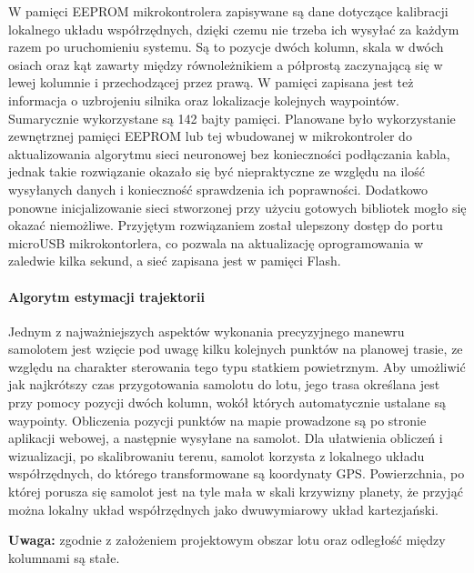 \documentclass[12pt, a4paper]{article}
\begin{document}
W pamięci EEPROM mikrokontrolera zapisywane są dane dotyczące kalibracji lokalnego  układu współrzędnych, dzięki czemu nie trzeba ich wysyłać za każdym razem po uruchomieniu systemu. Są to pozycje dwóch kolumn, skala w dwóch osiach oraz kąt zawarty między równoleżnikiem a półprostą zaczynającą się w lewej kolumnie i przechodzącej przez prawą. W pamięci zapisana jest też informacja o uzbrojeniu silnika oraz lokalizacje kolejnych waypointów. Sumarycznie wykorzystane są 142 bajty pamięci. Planowane było wykorzystanie zewnętrznej pamięci EEPROM lub tej wbudowanej w mikrokontroler do aktualizowania algorytmu sieci neuronowej bez konieczności podłączania kabla, jednak takie rozwiązanie okazało się być niepraktyczne ze względu na ilość wysyłanych danych i konieczność sprawdzenia ich poprawności. Dodatkowo ponowne inicjalizowanie sieci stworzonej przy użyciu gotowych bibliotek mogło się okazać niemożliwe. Przyjętym rozwiązaniem został ulepszony dostęp do portu microUSB mikrokontorlera, co pozwala na aktualizację oprogramowania w zaledwie kilka sekund, a sieć zapisana jest w pamięci Flash.

\FloatBarrier
\paragraph{Algorytm estymacji trajektorii}\mbox{}

Jednym z najważniejszych aspektów wykonania precyzyjnego manewru samolotem jest wzięcie pod uwagę kilku kolejnych punktów na planowej trasie, ze względu na charakter sterowania tego typu statkiem powietrznym. Aby umożliwić jak najkrótszy czas przygotowania samolotu do lotu, jego trasa określana jest przy pomocy pozycji dwóch kolumn, wokół których automatycznie ustalane są waypointy. Obliczenia pozycji punktów na mapie prowadzone są po stronie aplikacji webowej, a następnie wysyłane na samolot. Dla ułatwienia obliczeń i wizualizacji, po skalibrowaniu terenu, samolot korzysta z lokalnego układu współrzędnych, do którego transformowane są koordynaty GPS. Powierzchnia, po której porusza się samolot jest na tyle mała w skali krzywizny planety, że przyjąć można lokalny układ współrzędnych jako dwuwymiarowy układ kartezjański. 

\textbf{Uwaga:} zgodnie z założeniem projektowym obszar lotu oraz odległość między kolumnami są stałe.
\end{document}
